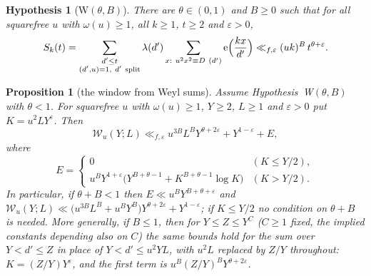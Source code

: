\documentclass[11pt,a4paper]{article}
\newtheorem{proposition}[theorem]{Proposition}
\newtheorem{hypothesis}[theorem]{Hypothesis}
\theoremstyle{remark}\newtheorem{remark}[theorem]{Remark}
\begin{document}
\begin{hypothesis}[W$(\theta,B)$]\label{hyp:W}
There are $\theta\in(0,1)$ and $B\ge0$ such that for all squarefree $u$ with $\omega(u)\ge1$, all $k\ge1$, $t\ge2$ and
$\varepsilon>0$,
\[
S_k(t)=\sum_{\substack{d'\le t\\ (d',u)=1,\ d'\ \mathrm{split}}}\lambda(d')\sum_{x:\ u^2x^2\equiv D\ (d')}\e\Bigl(\frac{kx}{d'}\Bigr)\ll_{f,\varepsilon}(uk)^{B}\,t^{\theta+\varepsilon}.
\]
\end{hypothesis}

\begin{proposition}[the window from Weyl sums]\label{prop:windowW}
Assume Hypothesis~W$(\theta,B)$ with $\theta<1$. For squarefree $u$ with $\omega(u)\ge1$, $Y\ge2$, $L\ge1$ and
$\varepsilon>0$ put $K=u^2LY^{\varepsilon}$. Then
\[
\mathcal W_u(Y;L)\ll_{f,\varepsilon}u^{3B}L^{B}Y^{\theta+2\varepsilon}+Y^{1-\varepsilon}+E,
\]
where
\[
E=\begin{cases}0&(K\le Y/2),\\[2pt] u^{B}Y^{1+\varepsilon}\bigl(Y^{B+\theta-1}+K^{B+\theta-1}\log K\bigr)&(K>Y/2).\end{cases}
\]
In particular, if $\theta+B<1$ then $E\ll u^{B}Y^{B+\theta+\varepsilon}$ and
$\mathcal W_u(Y;L)\ll\bigl(u^{3B}L^{B}+u^{B}Y^{B}\bigr)Y^{\theta+2\varepsilon}+Y^{1-\varepsilon}$; if $K\le Y/2$ no condition on
$\theta+B$ is needed. More generally, if $B\le1$, then for $Y\le Z\le Y^{C}$ ($C\ge1$ fixed, the implied constants depending also on $C$) the same bounds hold for the sum over $Y<d'\le Z$ in place of
$Y<d'\le u^2YL$, with $u^2L$ replaced by $Z/Y$ throughout: $K=(Z/Y)Y^{\varepsilon}$, and the first term is $u^B(Z/Y)^BY^{\theta+2\varepsilon}$.
\end{proposition}
\end{document}
